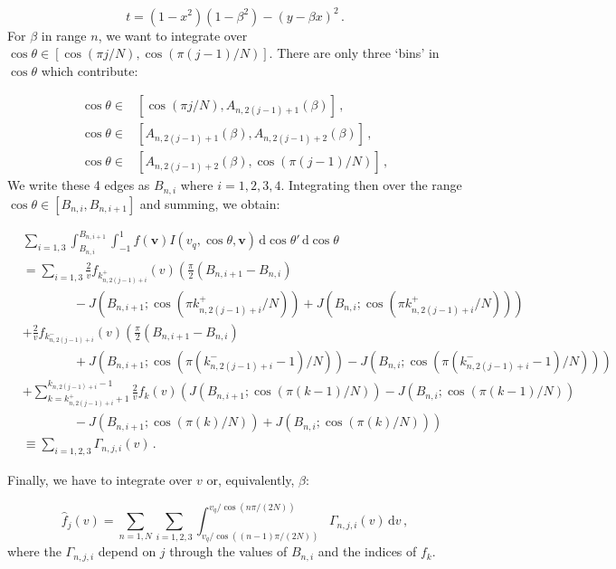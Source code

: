 \begin{equation}
t = (1-x^2)(1-\beta^2) - (y - \beta x)^2\,.
\end{equation}
For $\beta$ in range $n$, we want to integrate over $\cos\theta \in [\cos(\pi j/N), \cos(\pi (j-1)/N)]$. There are only three `bins' in $\cos\theta$ which contribute:

\begin{align*}
\cos\theta \in & [\cos(\pi j/N), A_{n,2(j-1)+1}(\beta)]\,, \\
\cos\theta \in & [A_{n,2(j-1)+1}(\beta), A_{n,2(j-1)+2}(\beta)]\,, \\
\cos\theta \in & [A_{n,2(j-1)+2}(\beta), \cos(\pi (j-1)/N)]\,,
\end{align*}
We write these 4 edges as $B_{n, i}$ where $i = 1,2,3,4$. Integrating then over the range $\cos\theta \in [B_{n,i}, B_{n,i+1}]$ and summing, we obtain:

\begin{align*}
& \sum_{i = 1,3}\int_{B_{n,i}}^{B_{n,i+1}} \int_{-1}^{1} f(\textbf{v}) I(v_q, \cos\theta, \textbf{v}) \, \mathrm{d}\cos\theta' \, \mathrm{d}\cos\theta\\
&=\sum_{i = 1,3} \frac{2}{v} f_{k_{n,2(j-1)+i}^+}(v) \left( \frac{\pi}{2}(B_{n,i+1} - B_{n,i}) \right.\\
&\qquad\qquad - \left.J(B_{n,i+1}; \cos(\pi k_{n,2(j-1)+i}^{+}/N)) + J(B_{n,i}; \cos(\pi k_{n,2(j-1)+i}^{+}/N))\right)\\
&+ \frac{2}{v} f_{k_{n,2(j-1)+i}^-}(v) \left( \frac{\pi}{2}(B_{n,i+1} - B_{n,i})\right. \\
&\qquad\qquad + \left. J(B_{n,i+1}; \cos(\pi (k_{n,2(j-1)+i}^{-}-1)/N)) - J(B_{n,i}; \cos(\pi (k_{n,2(j-1)+i}^{-}-1)/N))\right)\\
&+ \sum_{k = k_{n,2(j-1)+i}^+ +1}^{k_{n,2(j-1)+i}-1} \frac{2}{v} f_{k}(v) \left( J(B_{n,i+1};\cos(\pi (k-1)/N)) - J(B_{n,i};\cos(\pi (k-1)/N))\right. \\
&\qquad\qquad - \left. J(B_{n,i+1};\cos(\pi (k)/N)) + J(B_{n,i};\cos(\pi (k)/N)) \right)\\
&\equiv \sum_{i=1,2,3} \Gamma_{n,j,i}(v)\,.
\end{align*}

Finally, we have to integrate over $v$ or, equivalently, $\beta$:

\begin{equation}
\hat{f}_j(v) = \sum_{n = 1,N} \sum_{i=1,2,3} \int_{v_q/\cos((n-1)\pi/(2N))}^{v_q/\cos(n\pi/(2N))}  \Gamma_{n,j,i}(v) \, \mathrm{d}v\,,
\end{equation}
where the $\Gamma_{n,j,i}$ depend on $j$ through the values of $B_{n,i}$ and the indices of $f_k$.

